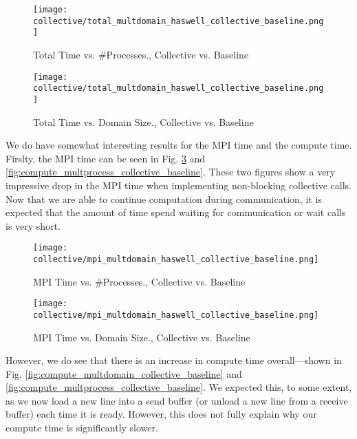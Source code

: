 \begin{enumerate}
	\begin{figure}[h] %
		\texttt{[image: collective/total\_multdomain\_haswell\_collective\_baseline.png]}
		\caption{Total Time vs. \#Processes., Collective vs. Baseline}
		\label{fig:total_multdomain_collective_baseline}
	\end{figure}	
	
	\begin{figure}[h] %
		\texttt{[image: collective/total\_multdomain\_haswell\_collective\_baseline.png]}
		\caption{Total Time vs. Domain Size., Collective vs. Baseline}
		\label{fig:total_multprocess_collective_baseline}
	\end{figure}	
    
    We do have somewhat interesting results for the MPI time and the compute time.
    Firslty, the MPI time can be seen in Fig. \ref{fig:mpi_multdomain_collective_baseline} and
	\ref{fig:compute_multprocess_collective_baseline}. These two figures show a very impressive
	drop in the MPI time when implementing non-blocking collective calls. Now that we are able
	to continue computation during communication, it is expected that the amount of time spend
	waiting for communication or wait calls is very short.
	
	\begin{figure}[h] %
		\texttt{[image: collective/mpi\_multdomain\_haswell\_collective\_baseline.png]}
		\caption{MPI Time vs. \#Processes., Collective vs. Baseline}
		\label{fig:mpi_multdomain_collective_baseline}
	\end{figure}	
	
	\begin{figure}[h] %
		\texttt{[image: collective/mpi\_multdomain\_haswell\_collective\_baseline.png]}
		\caption{MPI Time vs. Domain Size., Collective vs. Baseline}
		\label{fig:mpi_multprocess_collective_baseline}
	\end{figure}	
	
 	However, we do see that there is an increase in compute time 
 	overall---shown in Fig. \ref{fig:compute_multdomain_collective_baseline} and
	\ref{fig:compute_multprocess_collective_baseline}. We expected this, to some extent, as we now load a new 
	line into a send buffer (or unload a new line from a receive buffer) each time it is ready. However,
	this does not fully explain why our compute time is significantly slower.
	

\end{enumerate}
